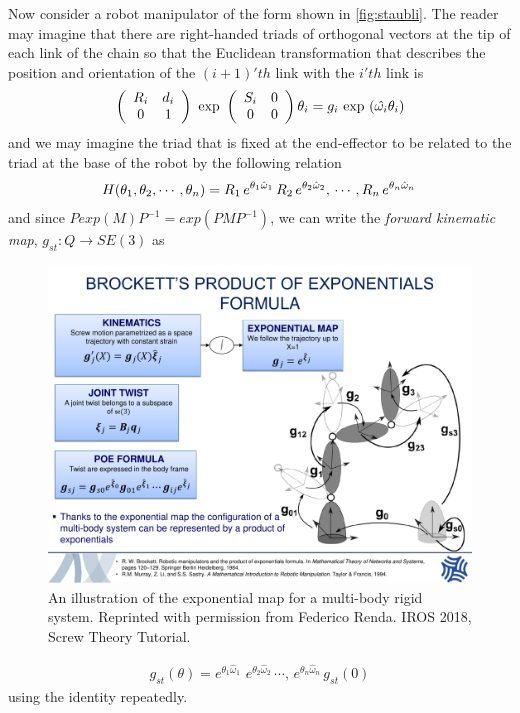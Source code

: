 Now consider a robot manipulator of the form shown in \autoref{fig:staubli}. The reader may imagine that there are right-handed triads of orthogonal vectors at the tip of each link of the chain so that the Euclidean transformation that describes the position and orientation of the $(i+1)'th$ link with the $i'th$ link is 
%
\begin{align}
\left(\begin{array}{cc}
{R}_i & {d}_i \\
0 & 1
\end{array}\right) \text{ exp } \left(\begin{array}{cc}
S_i & 0 \\
0 & 0
\end{array}\right)  \theta_i =  g_i \text{ exp } (\hat{\omega_i} \theta_i)
\end{align}
%
and we may imagine the triad that is fixed at the end-effector to be related to the triad at the base of the robot by the following relation
%
\begin{align}
H(\theta_1, \theta_2, \cdots, \theta_n) = \rot_1\,e^{\theta_1 \hat{\omega}_1}\,
%
\rot_2\,e^{\theta_2 \hat{\omega}_2},\, \cdots, 
%
\rot_n\,e^{\theta_n \hat{\omega}_n}\,	
\end{align}
%
and since $P exp(M) P^{-1} = exp(PMP^{-1})$, we can write the \textit{forward kinematic map}, $g_{st}: Q \rightarrow SE(3)$ as 
%
\begin{figure}[t!]
	\centering
	\includegraphics[width=\columnwidth]{figures/brockettpoe.pdf}
	\caption{An illustration of the exponential map for a multi-body rigid system. Reprinted with permission from Federico Renda. IROS 2018, Screw Theory Tutorial.}
	\label{fig:brockettpoe}
\end{figure}
%
\begin{align}
g_{st}(\theta) = e^{\theta_1 \hat{\omega}_1}\,
%
\,e^{\theta_2 \hat{\omega}_2}\, \cdots, 
%
\,e^{\theta_n \hat{\omega}_n}\,g_{st}(0)
\end{align}
%
using the identity repeatedly.
%
